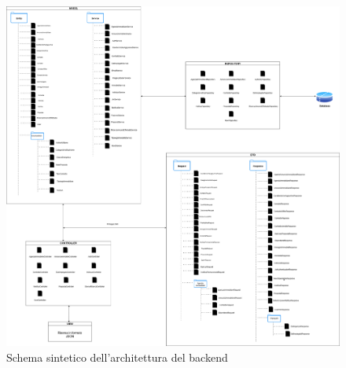 \begin{figure}[H]
	\centering
	\includegraphics[width=1\linewidth]{Immagini/Schema backend.png}
	\caption[schema backend]{Schema sintetico dell'architettura del backend}
\end{figure}

